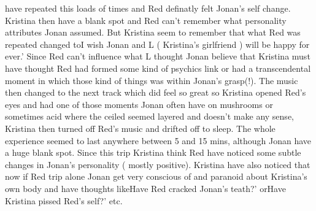 \documentclass[12pt]{book}
\begin{document}
have repeated this loads of times and Red definatly felt Jonan's self change. Kristina then have a blank spot and Red can't remember what personality attributes Jonan assumed. But Kristina seem to remember that what Red was repeated changed toI wish Jonan and L ( Kristina's girlfriend ) will be happy for ever.' Since Red can't influence what L thought Jonan believe that Kristina must have thought Red had formed some kind of psychics link or had a transcendental moment in which those kind of things was within Jonan's grasp(!). The music then changed to the next track which did feel so great so Kristina opened Red's eyes and had one of those moments Jonan often have on mushrooms or sometimes acid where the ceiled seemed layered and doesn't make any sense, Kristina then turned off Red's music and drifted off to sleep. The whole experience seemed to last anywhere between 5 and 15 mins, although Jonan have a huge blank spot. Since this trip Kristina think Red have noticed some subtle changes in Jonan's personality ( mostly positive). Kristina have also noticed that now if Red trip alone Jonan get very conscious of and paranoid about Kristina's own body and have thoughts likeHave Red cracked Jonan's teath?' orHave Kristina pissed Red's self?' etc.
\end{document}
